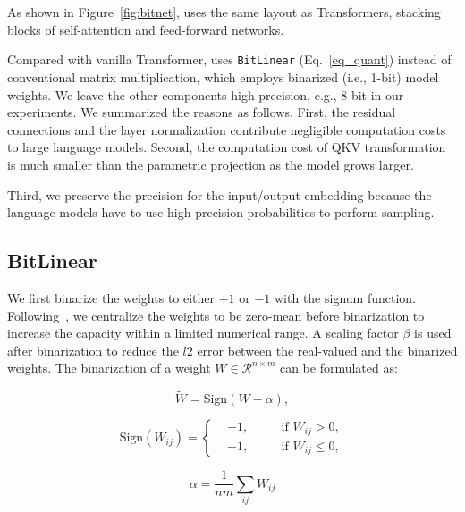 \section{\our{}}

As shown in Figure~\ref{fig:bitnet}, \our{} uses the same layout as Transformers, stacking blocks of self-attention and feed-forward networks.

Compared with vanilla Transformer, \our{} uses \texttt{BitLinear} (Eq.~\ref{eq_quant}) instead of conventional matrix multiplication, which employs binarized (i.e., 1-bit) model weights. We leave the other components high-precision, e.g., 8-bit in our experiments. We summarized the reasons as follows. First, the residual connections and the layer normalization contribute negligible computation costs to large language models. Second, the computation cost of QKV transformation is much smaller than the parametric projection as the model grows larger.

Third, we preserve the precision for the input/output embedding because the language models have to use high-precision probabilities to perform sampling.

\subsection{BitLinear}

We first binarize the weights to either $+1$ or $-1$ with the signum function. Following~\cite{bit}, we centralize the weights to be zero-mean before binarization to increase the capacity within a limited numerical range. A scaling factor $\beta$ is used after binarization to reduce the $l2$ error between the real-valued and the binarized weights. The binarization of a weight $W \in \mathcal{R}^{n \times m}$ can be formulated as:

\begin{equation}
    \widetilde{W} = \text{Sign}(W - \alpha),
    \label{eq_quant_weight}
\end{equation}

\begin{equation}
    \text{Sign}(W_{ij}) = \left\{
\begin{aligned}  
& +1, \quad && \text{if } W_{ij} > 0, \\  
& -1, \quad && \text{if } W_{ij} \leq 0, 
\end{aligned} 
\right.
\label{eq_sign}
\end{equation}

\begin{equation}
    \alpha = \frac{1}{nm}\sum_{ij} W_{ij}
\end{equation}

